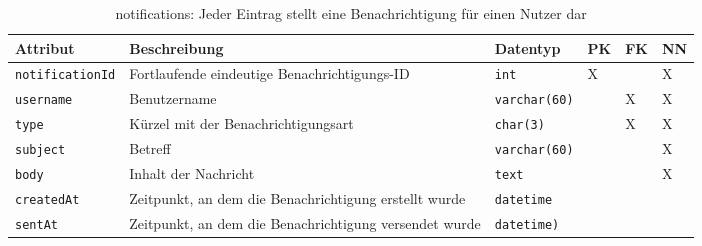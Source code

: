 \begin{table}[!ht]
	\caption{notifications: Jeder Eintrag stellt eine Benachrichtigung für einen Nutzer dar}
	\begin{tabular}{p{3cm}p{5cm}p{2cm}p{1cm}p{1cm}p{1cm}}
		\toprule 
		\textbf{Attribut} & \textbf{Beschreibung} & \textbf{Datentyp} & \textbf{PK} & \textbf{FK} & \textbf{NN} \\
		\hline 
		\texttt{notificationId} & Fortlaufende eindeutige Benachrichtigungs-ID & \texttt{int} & X & & X   \\
		\texttt{username} & Benutzername & \texttt{varchar(60)} & & X & X  \\
		\texttt{type} & Kürzel mit der Benachrichtigungsart & \texttt{char(3)} & & X & X  \\
		\texttt{subject} & Betreff & \texttt{varchar(60)} & & & X  \\
		\texttt{body} & Inhalt der Nachricht & \texttt{text} & & & X  \\
		\texttt{createdAt} & Zeitpunkt, an dem die Benachrichtigung erstellt wurde & \texttt{datetime} & & &  \\
		\texttt{sentAt} & Zeitpunkt, an dem die Benachrichtigung versendet wurde & \texttt{datetime)} & & & \\
		\bottomrule
	\end{tabular}
\end{table}






